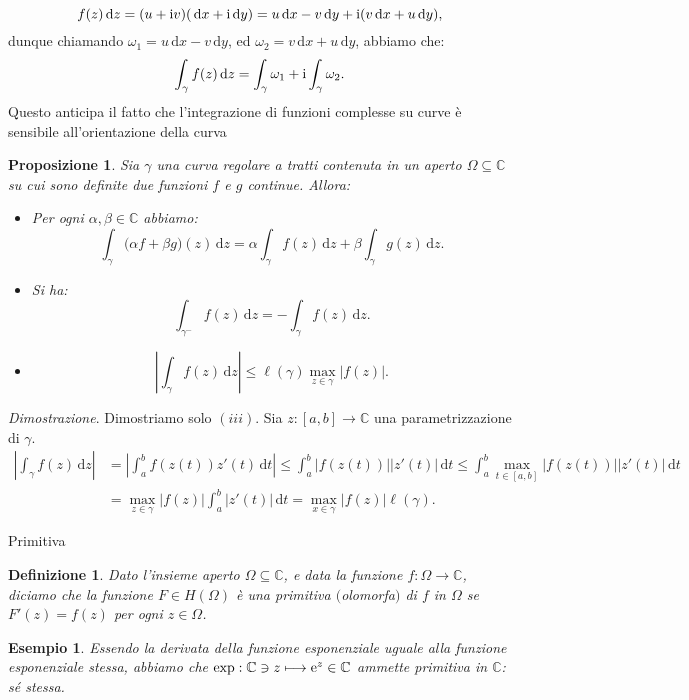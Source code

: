 \documentclass[11pt]{book}
\makeatletter
\theoremstyle{Definizione}
\newtheorem*{mydef}{Definizione}
\theoremstyle{TeoremaProposizioneLemmaCorollarioCongettura}
\newtheorem{mypropo}[myteo]{Proposizione}
\theoremstyle{OsservazioneNotaEsempio}
\newtheorem{myes}{Esempio}[section]
\renewenvironment{proof}[1][\proofname]{\par
  \normalfont \topsep6\p@\@plus6\p@\relax
  \trivlist
  \item[\hskip\labelsep
        \itshape
    #1\@addpunct{.}]\ignorespaces
}{%
  \endtrivlist\@endpefalse
}
\renewenvironment{proof}{\textsl{Dimostrazione}.}{}
\newcommand{\C}{\mathbb{C}}
\renewcommand{\i}{\textup{i}}
\newcommand{\e}{\textup{e}}
\renewcommand{\d}{\mathrm{d}}
\newcommand{\dz}{\,\d z}
\newcommand{\dt}{\,\d t}
\newcommand{\dx}{\,\d x}
\newcommand{\dy}{\,\d y}
\makeatother
\begin{document}
$$
f(z)\dz = (u+\i v)(\dx+\i\dy) = u\dx-v\dy + \i(v\dx+u\dy),
$$
dunque chiamando $\omega_1 = u\dx-v\dy$, ed $\omega_2 = v\dx+u\dy$, abbiamo che:
$$
\int_\gamma f(z)\dz = \int_\gamma \omega_1 + \i \int_\gamma \omega_2.
$$
Questo anticipa il fatto che l'integrazione di funzioni complesse su curve è sensibile all'orientazione della curva
\begin{boxpro}
\begin{mypropo}\label{pro:OvvietàIntegrali}
Sia $\gamma$ una curva regolare a tratti contenuta in un aperto $\Omega\subseteq \C$ su cui sono definite due funzioni $f$ e $g$ continue. Allora:
\begin{itemize}
\item[$(i)$] Per ogni $\alpha,\beta\in \C$ abbiamo:
$$
\int_\gamma \big(\alpha f + \beta g\big)(z)\dz = \alpha \int_\gamma f(z)\dz + \beta \int_\gamma g(z)\dz.
$$
\item[$(ii)$] Si ha:
$$
\int_{\gamma^-} f(z) \dz = -\int_\gamma f(z)\dz.
$$
\item[$(iii)$] 
$$
\left|\int_\gamma f(z) \dz\right| \leq \ell(\gamma) \max_{z\in \gamma} |f(z)|.
$$
\end{itemize}
\end{mypropo}
\tcblower
\begin{proof} Dimostriamo solo $(iii)$. Sia $z:[a,b]\longrightarrow \C$ una parametrizzazione di $\gamma$.
\begin{align*}
\left|\int_\gamma f(z) \dz\right| &= \left|\int_{a}^{b} f(z(t))z'(t) \dt\right| \leq \int_{a}^{b} |f(z(t))||z'(t)|\dt \leq \int_a^b \max_{t\in [a,b]} |f(z(t))| |z'(t)|\dt\\
&= \max_{z\in \gamma} |f(z)| \int_a^b |z'(t)|\dt = \max_{x\in \gamma} |f(z)| \ell(\gamma).
\end{align*}

\end{proof}
\end{boxpro}
\begin{boxdef}{Primitiva}
\begin{mydef}
Dato l'insieme aperto $\Omega\subseteq \C$, e data la funzione $f:\Omega\longrightarrow \C$, diciamo che la funzione $F\in H(\Omega)$ è una primitiva $($olomorfa$)$ di $f$ in $\Omega$ se $F'(z) = f(z)$ per ogni $z\in \Omega$.
\end{mydef}
\end{boxdef}
\begin{myes}
Essendo la derivata della funzione esponenziale uguale alla funzione esponenziale stessa, abbiamo che $\exp:\C\ni z \longmapsto \e^z\in \C$ ammette primitiva in $\C$: sé stessa.
\end{myes}
\end{document}
